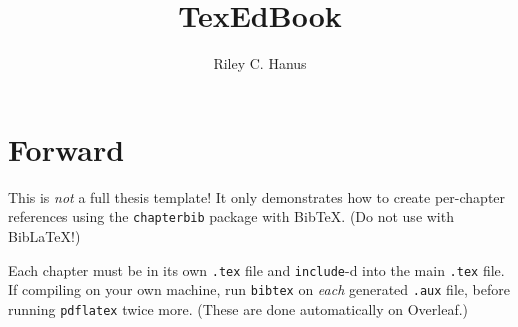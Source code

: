 \documentclass[11pt,oneside]{book}
\title{\Huge \textbf{TexEdBook}}
\author{Riley C. Hanus}
\begin{document}
\frontmatter
\maketitle

\chapter*{Forward}
This is \emph{not} a full thesis template! It only demonstrates how to create per-chapter references using the \texttt{chapterbib} package with BibTeX. (Do not use with BibLaTeX!)

Each chapter must be in its own \texttt{.tex} file and \texttt{include}-d into the main \texttt{.tex} file. If compiling on your own machine, run \texttt{bibtex} on \emph{each} generated \texttt{.aux} file, before running \texttt{pdflatex} twice more. (These are done automatically on Overleaf.)

\tableofcontents

\mainmatter






\backmatter

\end{document}
